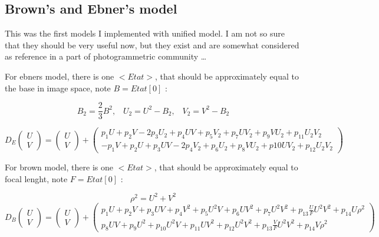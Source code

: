 \subsection{Brown's and Ebner's model}


This was the first models I implemented with unified model. I am not so sure that they
should be very useful now, but they exist and are somewhat considered as reference in a part
of photogrammetric community \dots


For ebners model, there is one $<Etat>$, that should be  approximately equal to the base in image space,
note $B=Etat[0]$ :

\begin{equation}
     B_2 = \frac{2}{3} B^2
    ,\;\;\;   U_2 = U^2 - B_2
    ,\;\;\;   V_2 = V^2 - B_2
\end{equation}


\begin{equation}
  D_E \begin{pmatrix}  U \\  V  \end{pmatrix} =
      \begin{pmatrix}  U \\  V  \end{pmatrix}
   +  \begin{pmatrix}
              p_1 U + p_2 V -2p_3 U_2 + p_4 UV +p_5 V_2 +p_7 UV_2 +p_9 VU_2    + p_{11} U_2 V_2   \\
              -p_1V + p_2 U + p_3 UV  -2p_4V_2 +p_6 U_2 +p_8 V U_2+p{10} UV_2  + p_{12} U_2 V_2
       \end{pmatrix}
\end{equation}


For brown model, there is one $<Etat>$, that should be approximately equal to focal lenght,
note $F=Etat[0]$ :

\begin{equation}
      \rho^2 =  U^2 + V^2
\end{equation}
\begin{equation}
  D_B \begin{pmatrix}  U \\  V  \end{pmatrix} =
      \begin{pmatrix}  U \\  V  \end{pmatrix}
   +  \begin{pmatrix}
              p_1 U + p_2 V  + p_3 UV + p_4 V^2 + p_5 U^2 V + p_6 UV^2 + p_7 U^2V^2 + p_{13}\frac{U}{F}U^2V^2 + p_{14} U \rho^2   \\
              p_8 UV + p_9 U^2 +p_{10}U^2V + p_{11}UV^2 + p_{12} U^2V^2 + p_{13}\frac{V}{F}U^2V^2 +  p_{14} V \rho^2
       \end{pmatrix}
\end{equation}



